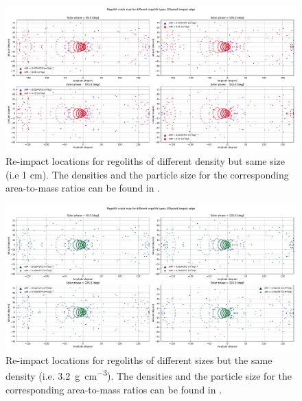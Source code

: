 \begin{figure}[htb]
\centering
\captionsetup{justification=centering}
\includegraphics[angle=90, width=\textwidth, height=\textheight, keepaspectratio=true]{longest_edge_perturbations/multiple_regolith_types/allPhases_crashMap_3P2_7P5_density_1cm_Radius.pdf}
\caption{Re-impact locations for regoliths of different density but same size (i.e 1 cm). The densities and the particle size for the corresponding area-to-mass ratios can be found in .}
\label{fig:crashmap_3.2_7.5_density_1cmRadius}
\end{figure}
\FloatBarrier
\begin{figure}[htb]
\centering
\captionsetup{justification=centering}
\includegraphics[angle=90, width=\textwidth, height=\textheight, keepaspectratio=true]{longest_edge_perturbations/multiple_regolith_types/allPhases_crashMap_3P2_density_1cm_5cm_Radius.pdf}
\caption{Re-impact locations for regoliths of different sizes but the same density (i.e. \SI{3.2}{\gram\per\centi\metre\cubed}). The densities and the particle size for the corresponding area-to-mass ratios can be found in .}
\label{fig:crashmap_3.2_density_1cm_5cm_Radius}
\end{figure}
\FloatBarrier
